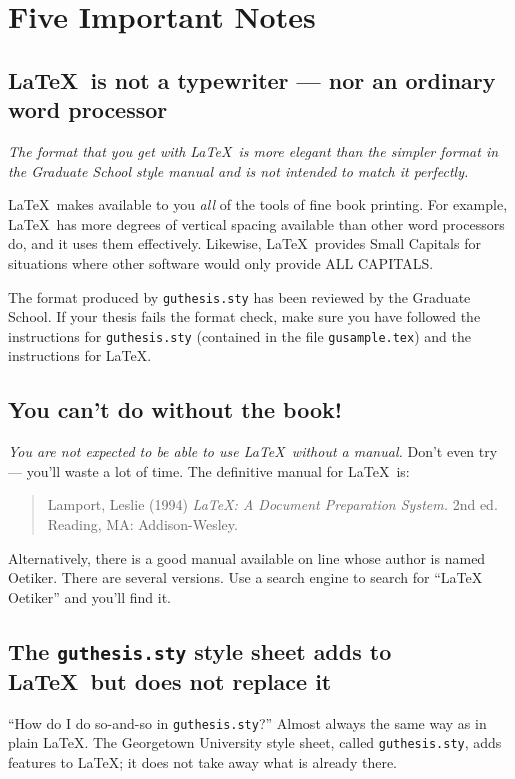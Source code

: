 \documentclass[12pt]{report}
\begin{document}
\chapter{Five Important Notes}

\section{\LaTeX\ is not a typewriter --- nor an ordinary word processor}

\emph{The format that you get with \LaTeX\ is more elegant
than the simpler format in the Graduate School style manual and is not
intended to match it perfectly.}

\LaTeX\ makes available to you \emph{all} of the tools of fine book printing.
For example, \LaTeX\ has more degrees of
vertical spacing available than other word processors do, and it uses them
effectively.  Likewise, \LaTeX\ provides {\sc Small Capitals} for situations
where other software would only provide ALL CAPITALS.

The format produced by \verb"guthesis.sty" has been reviewed by the Graduate School.
If your thesis fails the format check, make sure you have followed the
instructions for \verb"guthesis.sty" (contained in the file \verb"gusample.tex")
and the instructions for \LaTeX.

\section{You can't do without the book!}

\emph{You are not expected to be able to use \LaTeX\ without a manual.}
Don't even try --- you'll waste a lot of time.
The definitive manual for \LaTeX\ is:
\begin{quote}
Lamport, Leslie (1994) \emph{\LaTeX: A Document Preparation System.}
2nd ed.
Reading, MA: Addison-Wesley.
\end{quote}
Alternatively, there is a good manual available on line whose author is
named Oetiker.
There are several versions.  Use a search engine to search for
``LaTeX Oetiker'' and you'll find it.

\section{The {\tt guthesis.sty} style sheet adds to \LaTeX\ but does not replace it}

``How do I do so-and-so in \verb"guthesis.sty"?''  Almost always the same way as
in plain \LaTeX.
The Georgetown University style sheet, called \verb"guthesis.sty", adds features
to \LaTeX; it does not take away what is already there.
\end{document}
